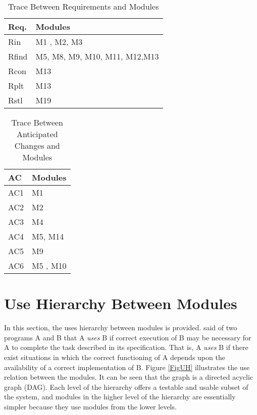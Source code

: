 \documentclass[12pt, titlepage]{article}
\begin{document}
\begin{table}[H]
\centering
\begin{tabular}{p{} p{}}
\toprule
\textbf{Req.} & \textbf{Modules}\\
\midrule
Rin & M1 , M2, M3 \\
Rfind & M5, M8, M9, M10, M11, M12,M13\\
Rcon & M13\\
Rplt & M13 \\
Rstl & M19\\
\bottomrule
\end{tabular}
\caption{Trace Between Requirements and Modules}
\label{TblRT}
\end{table}

\begin{table}[H]
\centering
\begin{tabular}{p{} p{}}
\toprule
\textbf{AC} & \textbf{Modules}\\
\midrule
AC1 & M1\\
AC2 & M2\\
AC3 & M4\\
AC4 & M5, M14\\
AC5 & M9\\ 
AC6 & M5 , M10\\
\bottomrule
\end{tabular}
\caption{Trace Between Anticipated Changes and Modules}
\label{TblACT}
\end{table}

\section{Use Hierarchy Between Modules} \label{SecUse}

In this section, the uses hierarchy between modules is
provided. \citet{Parnas1978} said of two programs A and B that A {\em uses} B if
correct execution of B may be necessary for A to complete the task described in
its specification. That is, A {\em uses} B if there exist situations in which
the correct functioning of A depends upon the availability of a correct
implementation of B.  Figure \ref{FigUH} illustrates the use relation between
the modules. It can be seen that the graph is a directed acyclic graph
(DAG). Each level of the hierarchy offers a testable and usable subset of the
system, and modules in the higher level of the hierarchy are essentially simpler
because they use modules from the lower levels.
\end{document}
